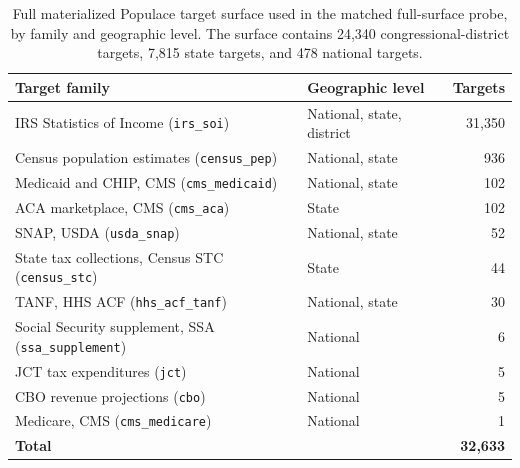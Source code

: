 \begin{table}[H]
\centering
{\tablefont
\begin{tabular}{@{}p{}l r@{}}
\toprule
Target family & Geographic level & Targets \\
\midrule
IRS Statistics of Income (\texttt{irs\_soi}) & National, state, district & 31{,}350 \\
Census population estimates (\texttt{census\_pep}) & National, state & 936 \\
Medicaid and CHIP, CMS (\texttt{cms\_medicaid}) & National, state & 102 \\
ACA marketplace, CMS (\texttt{cms\_aca}) & State & 102 \\
SNAP, USDA (\texttt{usda\_snap}) & National, state & 52 \\
State tax collections, Census STC (\texttt{census\_stc}) & State & 44 \\
TANF, HHS ACF (\texttt{hhs\_acf\_tanf}) & National, state & 30 \\
Social Security supplement, SSA (\texttt{ssa\_supplement}) & National & 6 \\
JCT tax expenditures (\texttt{jct}) & National & 5 \\
CBO revenue projections (\texttt{cbo}) & National & 5 \\
Medicare, CMS (\texttt{cms\_medicare}) & National & 1 \\
\midrule
\textbf{Total} & & \textbf{32{,}633} \\
\bottomrule
\end{tabular}
}
\caption{Full materialized Populace target surface used in the matched full-surface probe, by family and
geographic level. The surface contains 24{,}340 congressional-district targets, 7{,}815 state targets, and
478 national targets.}
\label{tab:target_subset}
\end{table}
